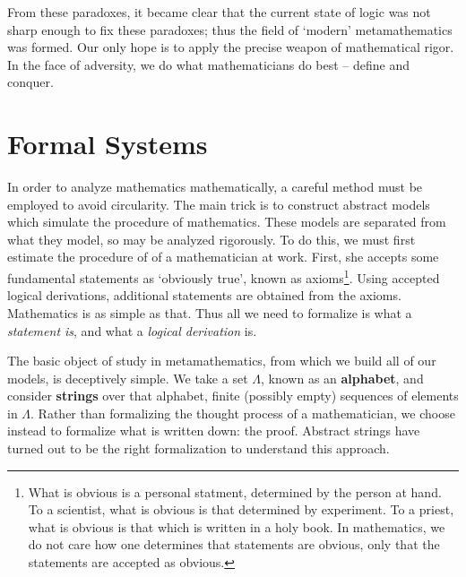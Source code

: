 From these paradoxes, it became clear that the current state of logic was not sharp enough to fix these paradoxes; thus the field of `modern' metamathematics was formed. Our only hope is to apply the precise weapon of mathematical rigor. In the face of adversity, we do what mathematicians do best -- define and conquer.

\section{Formal Systems}

In order to analyze mathematics mathematically, a careful method must be employed to avoid circularity. The main trick is to construct abstract models which simulate the procedure of mathematics. These models are separated from what they model, so may be analyzed rigorously. To do this, we must first estimate the procedure of of a mathematician at work. First, she accepts some fundamental statements as `obviously true', known as axioms\footnote{What is obvious is a personal statment, determined by the person at hand. To a scientist, what is obvious is that determined by experiment. To a priest, what is obvious is that which is written in a holy book. In mathematics, we do not care how one determines that statements are obvious, only that the statements are accepted as obvious.}. Using accepted logical derivations, additional statements are obtained from the axioms. Mathematics is as simple as that. Thus all we need to formalize is what a {\it statement is}, and what a {\it logical derivation} is.

The basic object of study in metamathematics, from which we build all of our models, is deceptively simple. We take a set $\Lambda$, known as an {\bf alphabet}, and consider {\bf strings} over that alphabet, finite (possibly empty) sequences of elements in $\Lambda$. Rather than formalizing the thought process of a mathematician, we choose instead to formalize what is written down: the proof. Abstract strings have turned out to be the right formalization to understand this approach.

